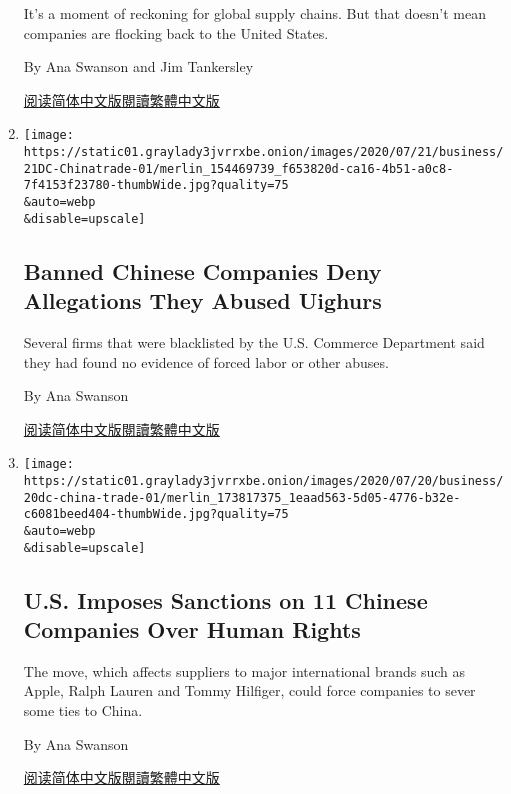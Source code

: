 \begin{enumerate}
  It's a moment of reckoning for global supply chains. But that doesn't
  mean companies are flocking back to the United States.

  By Ana Swanson and Jim Tankersley

  \href{https://cn.nytimes3xbfgragh.onion/business/20200723/coronavirus-globalization-jobs-supply-chain-china/}{阅读简体中文版}\href{https://cn.nytimes3xbfgragh.onion/business/20200723/coronavirus-globalization-jobs-supply-chain-china/zh-hant/}{閱讀繁體中文版}
\item
  \href{/2020/07/21/business/china-us-trade-banned.html}{}

  \texttt{[image: https://static01.graylady3jvrrxbe.onion/images/2020/07/21/business/21DC-Chinatrade-01/merlin\_154469739\_f653820d-ca16-4b51-a0c8-7f4153f23780-thumbWide.jpg?quality=75\\\&auto=webp\\\&disable=upscale]}

  \hypertarget{banned-chinese-companies-deny-allegations-they-abused-uighurs}{%
  \subsection{Banned Chinese Companies Deny Allegations They Abused
  Uighurs}\label{banned-chinese-companies-deny-allegations-they-abused-uighurs}}

  Several firms that were blacklisted by the U.S. Commerce Department
  said they had found no evidence of forced labor or other abuses.

  By Ana Swanson

  \href{https://cn.nytimes3xbfgragh.onion/business/20200722/china-us-trade-banned/}{阅读简体中文版}\href{https://cn.nytimes3xbfgragh.onion/business/20200722/china-us-trade-banned/zh-h}{閱讀繁體中文版}
\item
  \href{/2020/07/20/business/economy/china-sanctions-uighurs-labor.html}{}

  \texttt{[image: https://static01.graylady3jvrrxbe.onion/images/2020/07/20/business/20dc-china-trade-01/merlin\_173817375\_1eaad563-5d05-4776-b32e-c6081beed404-thumbWide.jpg?quality=75\\\&auto=webp\\\&disable=upscale]}

  \hypertarget{us-imposes-sanctions-on-11-chinese-companies-over-human-rights}{%
  \subsection{U.S. Imposes Sanctions on 11 Chinese Companies Over Human
  Rights}\label{us-imposes-sanctions-on-11-chinese-companies-over-human-rights}}

  The move, which affects suppliers to major international brands such
  as Apple, Ralph Lauren and Tommy Hilfiger, could force companies to
  sever some ties to China.

  By Ana Swanson

  \href{https://cn.nytimes3xbfgragh.onion/business/20200721/china-sanctions-uighurs-labor/}{阅读简体中文版}\href{https://cn.nytimes3xbfgragh.onion/business/20200721/china-sanctions-uighurs-labor/zh-}{閱讀繁體中文版}
\end{enumerate}

